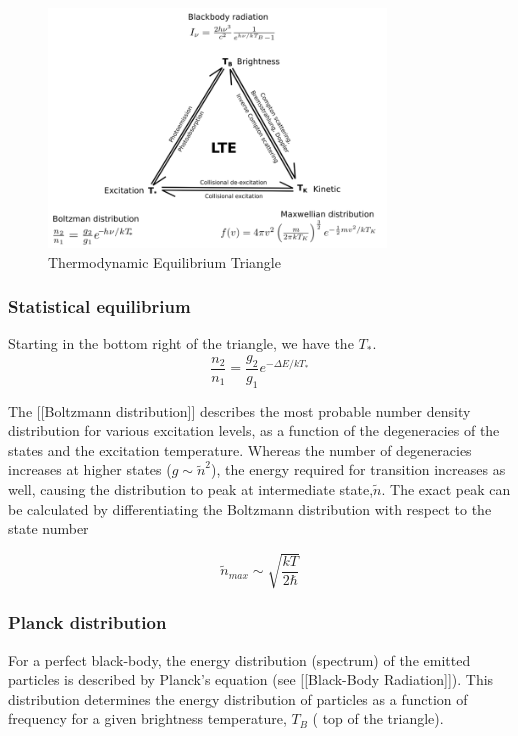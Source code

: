 \documentclass{article}
\begin{document}
\begin{figure}
    \centering
    \includegraphics[width = 0.8\textwidth]{figures/800px-EquilibriaTriangle.png}
    \caption{Thermodynamic Equilibrium Triangle}
    \label{fig:triangle}
\end{figure}


\subsubsection{Statistical equilibrium}
Starting in the bottom right of the triangle, we have the $T_*$.
\begin{equation} 
\frac{n_2}{n_1} = \frac{g_2}{g_1} e^{-\Delta E/kT_*}
\end{equation}

 The [[Boltzmann distribution]] describes the most probable number density distribution for various excitation levels, as a function of the degeneracies of the states and the excitation temperature. Whereas the number of degeneracies increases at higher states ($g \sim \tilde{n}^2$), the energy required for transition increases as well, causing the distribution to peak at intermediate state,$\tilde{n}$. The exact peak can be calculated by differentiating the Boltzmann distribution with respect to the state number 

\begin{equation} 
\tilde{n}_{max} \sim \sqrt{\frac{kT}{2\hbar}}
\end{equation}

\subsubsection{Planck distribution}
For a perfect black-body, the energy distribution (spectrum) of the emitted particles is described by Planck's equation (see [[Black-Body Radiation]]). This distribution determines the energy distribution of particles as a function of frequency for a given brightness temperature, $T_B$ ( top of the triangle). 
\end{document}
